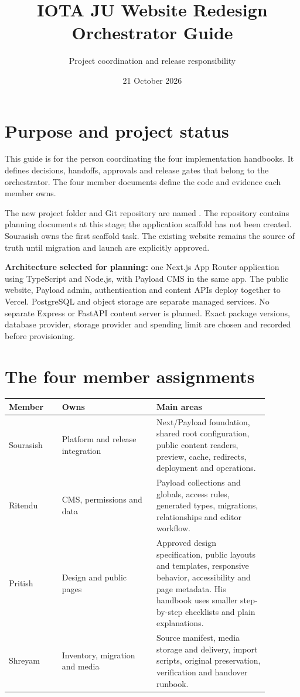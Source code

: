 \documentclass[11pt]{article}
\title{IOTA JU Website Redesign\\Orchestrator Guide}
\author{Project coordination and release responsibility}
\date{21 October 2026}
\newcommand{\code}[1]{\path{#1}}
\begin{document}
\maketitle

\section{Purpose and project status}
This guide is for the person coordinating the four implementation handbooks. It defines decisions, handoffs, approvals and release gates that belong to the orchestrator. The four member documents define the code and evidence each member owns.

The new project folder and Git repository are named \code{iota-ju-next}. The repository contains planning documents at this stage; the application scaffold has not been created. Sourasish owns the first scaffold task. The existing website remains the source of truth until migration and launch are explicitly approved.

\textbf{Architecture selected for planning:} one Next.js App Router application using TypeScript and Node.js, with Payload CMS in the same app. The public website, Payload admin, authentication and content APIs deploy together to Vercel. PostgreSQL and object storage are separate managed services. No separate Express or FastAPI content server is planned. Exact package versions, database provider, storage provider and spending limit are chosen and recorded before provisioning.

\section{The four member assignments}
\begin{longtable}{|>{\raggedright\arraybackslash}p{0.18\linewidth}|>{\raggedright\arraybackslash}p{0.32\linewidth}|>{\raggedright\arraybackslash}p{0.38\linewidth}|}
\hline
\textbf{Member} & \textbf{Owns} & \textbf{Main areas} \\
\hline
Sourasish & Platform and release integration & Next/Payload foundation, shared root configuration, public content readers, preview, cache, redirects, deployment and operations. \\
\hline
Ritendu & CMS, permissions and data & Payload collections and globals, access rules, generated types, migrations, relationships and editor workflow. \\
\hline
Pritish & Design and public pages & Approved design specification, public layouts and templates, responsive behavior, accessibility and page metadata. His handbook uses smaller step-by-step checklists and plain explanations. \\
\hline
Shreyam & Inventory, migration and media & Source manifest, media storage and delivery, import scripts, original preservation, verification and handover runbook. \\
\hline
\end{longtable}
\end{document}
